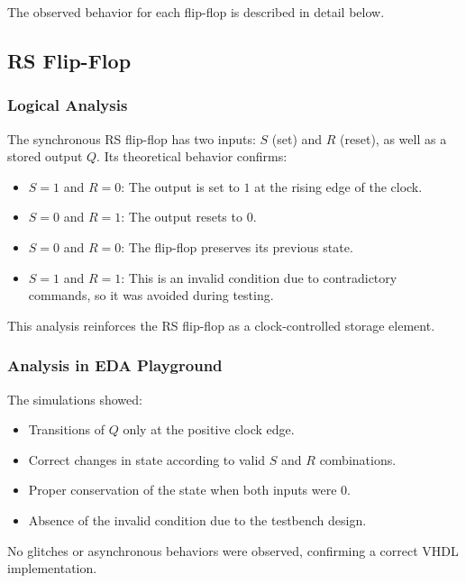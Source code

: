 \documentclass[12pt]{article}  %
\begin{document}
The observed behavior for each flip-flop is described in detail below.

\subsection{RS Flip-Flop}

\subsubsection{Logical Analysis}
The synchronous RS flip-flop has two inputs: $S$ (set) and $R$ (reset), as well as a stored output $Q$. Its theoretical behavior confirms:
\begin{itemize}
    \item $S = 1$ and $R = 0$: The output is set to $1$ at the rising edge of the clock.
    \item $S = 0$ and $R = 1$: The output resets to $0$.
    \item $S = 0$ and $R = 0$: The flip-flop preserves its previous state.
    \item $S = 1$ and $R = 1$: This is an invalid condition due to contradictory commands, so it was avoided during testing.
\end{itemize}
This analysis reinforces the RS flip-flop as a clock-controlled storage element.

\subsubsection{Analysis in EDA Playground}
The simulations showed:
\begin{itemize}
    \item Transitions of $Q$ only at the positive clock edge.
    \item Correct changes in state according to valid $S$ and $R$ combinations.
    \item Proper conservation of the state when both inputs were $0$.
    \item Absence of the invalid condition due to the testbench design.
\end{itemize}
No glitches or asynchronous behaviors were observed, confirming a correct VHDL implementation.
\end{document}
